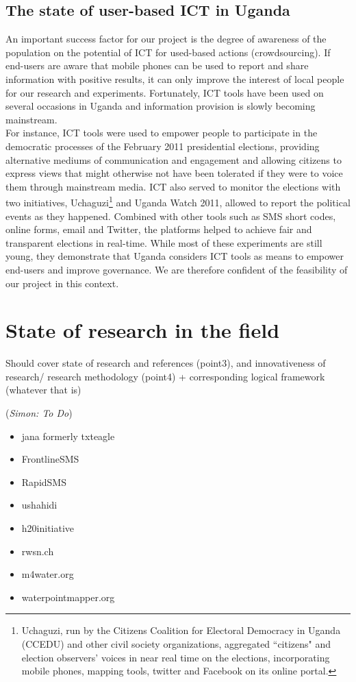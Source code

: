 \documentclass[11pt]{article}
\newcommand{\simon}[1]{\vspace{1em}(\emph{Simon: #1})\vspace{1em}}
\begin{document}
\subsection{The state of user-based ICT in Uganda}
An important success factor for our project is the degree of awareness of the population on the potential of ICT for used-based actions (crowdsourcing). If end-users are aware that mobile phones can be used to report and share information with positive results, it can only improve the interest of local people for our research and experiments. Fortunately, ICT tools have been used on several occasions in Uganda and information provision is slowly becoming mainstream.
\\
For instance, ICT tools were used to empower people to participate in the democratic processes of the February 2011 presidential elections\cite{Post11}, providing alternative mediums of communication and engagement and allowing citizens to express views that might otherwise not have been tolerated if they were to voice them through mainstream media\cite{Post11}\cite{ Ashnah12}. ICT also served to monitor the elections with two initiatives, Uchaguzi\footnote{Uchaguzi, run by the Citizens Coalition for Electoral Democracy in Uganda (CCEDU) and other civil society organizations, aggregated ``citizens" and election observers' voices in near real time on the elections, incorporating mobile phones, mapping tools, twitter and Facebook on its online portal\cite{Post11}.} and Uganda Watch 2011, allowed to report the political events as they happened. Combined with other tools such as SMS short codes, online forms, email and Twitter, the platforms helped to achieve fair and transparent elections in real-time\cite{
Post11}\cite{ Ashnah12}.
While most of these experiments are still young, they demonstrate that Uganda considers ICT tools as means to empower end-users and improve governance. We are therefore confident of the feasibility of our project in this context.


\section{State of research in the field}\label{state_of_research}
Should cover state of research and references (point3), and innovativeness of research/ research methodology (point4) + corresponding logical framework (whatever that is)

\simon{To Do}

\begin{itemize}
 \item jana formerly txteagle
 \item FrontlineSMS
 \item RapidSMS
 \item ushahidi
 \item h20initiative
 \item rwsn.ch
 \item m4water.org
 \item waterpointmapper.org
\end{itemize}
\end{document}
